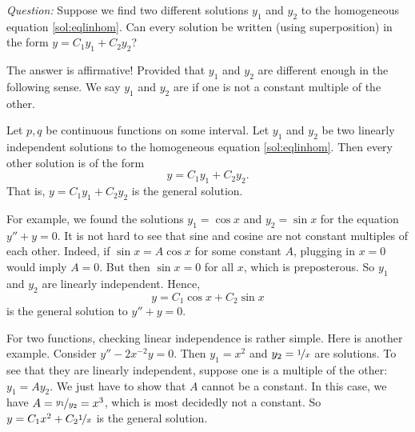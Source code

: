 \emph{Question:} Suppose we find two different solutions $y_1$ and $y_2$ to the
homogeneous equation \eqref{sol:eqlinhom}.  Can every solution
be written (using superposition) in the form
$y = C_1 y_1 + C_2 y_2$?

The answer is affirmative!  Provided that $y_1$ and $y_2$ are different enough in
the following sense.  We say $y_1$ and $y_2$ are \emph{} if one is not a constant multiple of the other.

\begin{theorem}
Let $p, q$ be continuous functions on some interval.
Let $y_1$ and $y_2$ be two linearly independent
solutions to the homogeneous equation \eqref{sol:eqlinhom}. 
Then every other solution is 
of the form
\begin{equation*}
y = C_1 y_1 + C_2 y_2 .
\end{equation*}
That is, $y = C_1 y_1 + C_2 y_2$ is the general solution.
\end{theorem}

For example, we found the solutions
$y_1 = \cos x$ and $y_2 = \sin x$ for the
equation $y'' + y = 0$.  It is not hard to see that sine and cosine are not
constant
multiples of each other.  Indeed, if $\sin x = A \cos x$ for some constant $A$,
plugging in $x=0$ would imply $A = 0$.  But then $\sin x = 0$ for all
$x$, which is preposterous.
So $y_1$ and $y_2$ are linearly independent.  Hence,
\begin{equation*}
y = C_1 \cos x + C_2 \sin x 
\end{equation*}
is the general solution to $y'' + y = 0$.

For two functions, checking linear independence is rather simple.  Here is
another example.  Consider $y''-2x^{-2}y = 0$.  Then $y_1 = x^2$ and $y_2 =
\nicefrac{1}{x}$ are solutions.  To see that they are linearly independent,
suppose one is a multiple of the other: $y_1 = A y_2$.  We just have to show
that $A$ cannot be a constant.  In this case, we have $A =
\nicefrac{y_1}{y_2} = x^3$, which is most decidedly not a constant.
So $y = C_1 x^2 + C_2 \nicefrac{1}{x}$ is the general solution.

\medskip

